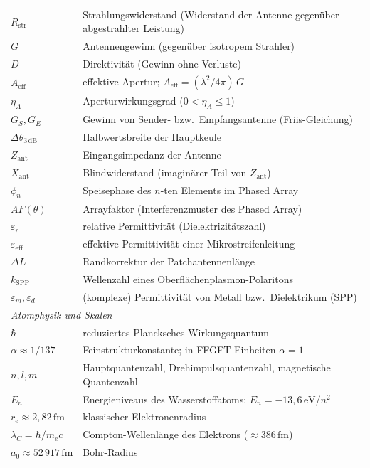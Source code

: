 \begin{longtable}{@{}lp{11cm}@{}}
$R_\mathrm{str}$ & Strahlungswiderstand (Widerstand der Antenne gegenüber abgestrahlter Leistung) \\
$G$ & Antennengewinn (gegenüber isotropem Strahler) \\
$D$ & Direktivität (Gewinn ohne Verluste) \\
$A_\mathrm{eff}$ & effektive Apertur; $A_\mathrm{eff} = (\lambda^2/4\pi)\,G$ \\
$\eta_A$ & Aperturwirkungsgrad ($0 < \eta_A \leq 1$) \\
$G_S, G_E$ & Gewinn von Sender- bzw.\ Empfangsantenne (Friis-Gleichung) \\
$\Delta\theta_{3\,\mathrm{dB}}$ & Halbwertsbreite der Hauptkeule \\
$Z_\mathrm{ant}$ & Eingangsimpedanz der Antenne \\
$X_\mathrm{ant}$ & Blindwiderstand (imaginärer Teil von $Z_\mathrm{ant}$) \\
$\phi_n$ & Speisephase des $n$-ten Elements im Phased Array \\
$AF(\theta)$ & Arrayfaktor (Interferenzmuster des Phased Array) \\
$\varepsilon_r$ & relative Permittivität (Dielektrizitätszahl) \\
$\varepsilon_\mathrm{eff}$ & effektive Permittivität einer Mikrostreifenleitung \\
$\Delta L$ & Randkorrektur der Patchantennenlänge \\
$k_\mathrm{SPP}$ & Wellenzahl eines Oberflächenplasmon-Polaritons \\
$\varepsilon_m, \varepsilon_d$ & (komplexe) Permittivität von Metall bzw.\ Dielektrikum (SPP) \\
\midrule
\multicolumn{2}{l}{\textit{Atomphysik und Skalen}} \\
$\hbar$ & reduziertes Plancksches Wirkungsquantum \\
$\alpha \approx 1/137$ & Feinstrukturkonstante; in FFGFT-Einheiten $\alpha = 1$ \\
$n, l, m$ & Hauptquantenzahl, Drehimpulsquantenzahl, magnetische Quantenzahl \\
$E_n$ & Energieniveaus des Wasserstoffatoms; $E_n = -13{,}6\,\mathrm{eV}/n^2$ \\
$r_e \approx 2{,}82\,\mathrm{fm}$ & klassischer Elektronenradius \\
$\lambda_C = \hbar/m_e c$ & Compton-Wellenlänge des Elektrons (${\approx}386\,\mathrm{fm}$) \\
$a_0 \approx 52\,917\,\mathrm{fm}$ & Bohr-Radius \\

\end{longtable}
